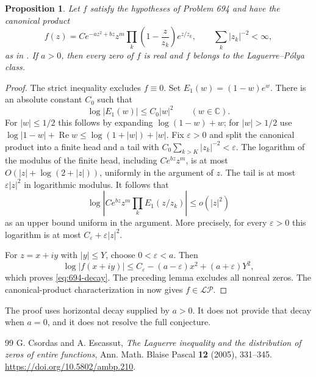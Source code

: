 \documentclass[11pt,a4paper]{article}
\newtheorem{proposition}[theorem]{Proposition}
\theoremstyle{remark}
\begin{document}
\begin{proposition}
Let $f$ satisfy the hypotheses of Problem 694 and have the canonical
product
\[
 f(z)=C e^{-az^2+bz}z^m
       \prod_k\left(1-\frac z{z_k}\right)e^{z/z_k},
 \qquad
 \sum_k|z_k|^{-2}<\infty,
\]
as in \cite[Definition 1.1]{CsordasEscassut2005}.  If $a>0$, then every
zero of $f$ is real and $f$ belongs to the Laguerre--P\'olya class.
\end{proposition}

\begin{proof}
The strict inequality excludes $f\equiv0$.
Set $E_1(w)=(1-w)e^w$.  There is an absolute constant $C_0$ such that
\[
 \log|E_1(w)|\le C_0|w|^2\qquad(w\in\mathbb C).
\]
For $|w|\le1/2$ this follows by expanding
$\log(1-w)+w$; for $|w|>1/2$ use
$\log|1-w|+\operatorname{Re}w\le\log(1+|w|)+|w|$.
Fix $\varepsilon>0$ and split the canonical product into a finite head
and a tail with $C_0\sum_{k>K}|z_k|^{-2}<\varepsilon$.
The logarithm of the modulus of the finite head, including $C e^{bz}z^m$,
is at most $O(|z|+\log(2+|z|))$, uniformly in the argument of $z$.
The tail is at most $\varepsilon|z|^2$ in logarithmic modulus.
It follows that
\[
 \log\left|C e^{bz}z^m\prod_kE_1(z/z_k)\right|
 \le o(|z|^2)
\]
as an upper bound uniform in the argument.  More precisely, for every
$\varepsilon>0$ this logarithm is at most
$C_\varepsilon+\varepsilon|z|^2$.

For $z=x+iy$ with $|y|\le Y$, choose $0<\varepsilon<a$.  Then
\[
 \log|f(x+iy)|
 \le C_\varepsilon-(a-\varepsilon)x^2
             +(a+\varepsilon)Y^2,
\]
which proves \eqref{eq:694-decay}.  The preceding lemma excludes all
nonreal zeros.  The canonical-product characterization in
\cite[Definition 1.2]{CsordasEscassut2005} now gives
$f\in\mathcal{L}\mathcal{P}$.
\end{proof}

The proof uses horizontal decay supplied by $a>0$.  It does not provide
that decay when $a=0$, and it does not resolve the full conjecture.


\begingroup\small
\begin{thebibliography}{99}
 G. Csordas and A. Escassut, \emph{The Laguerre inequality and the distribution of zeros of entire functions}, Ann. Math. Blaise Pascal \textbf{12} (2005), 331--345. \url{https://doi.org/10.5802/ambp.210}.
\end{thebibliography}
\endgroup
\end{document}
